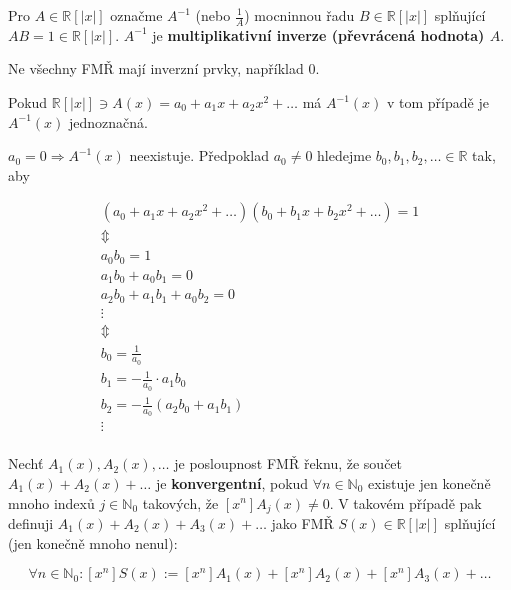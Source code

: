 \begin{definice}
	Pro $A \in \mathbb{R}[|x|]$ označme $A^{-1}$ (nebo $\frac{1}{A}$) mocninnou řadu $B \in \mathbb{R}[|x|]$ splňující $AB = 1 \in \mathbb{R}[|x|]$. $A^{-1}$ je \textbf{multiplikativní inverze (převrácená hodnota) $A$}.
\end{definice}

\begin{pozn}
	Ne všechny FMŘ mají inverzní prvky, například $0$.
\end{pozn}

\begin{tvrz}
	Pokud $\mathbb{R}[|x|] \ni A(x) = a_{0} + a_{1} x + a_{2} x^{2} + \dots$ má $A^{-1}(x)$ v tom případě je $A^{-1}(x)$ jednoznačná.
\end{tvrz}

\begin{dukaz}
	$a_{0} = 0 \Rightarrow A^{-1}(x)$ neexistuje. Předpoklad $a_{0} \neq 0$ hledejme $b_{0},b_{1},b_{2},\dots \in \mathbb{R}$ tak, aby
	
	$$
	\begin{array}{c}
		(a_{0} + a_{1} x + a_{2} x^{2} + \dots)(b_{0} + b_{1} x + b_{2} x^{2} + \dots) = 1 \\
		\Updownarrow \\
		a_{0}b_{0} = 1 \\
		a_{1}b_{0} + a_{0}b_{1} = 0 \\
		a_{2}b_{0} + a_{1}b_{1} + a_{0}b_{2} = 0 \\
		\vdots \\
		\Updownarrow \\
		b_{0} = \frac{1}{a_{0}} \\
		b_{1} = - \frac{1}{a_{0}} \cdot a_{1}b_{0} \\
		b_{2} = - \frac{1}{a_{0}}(a_{2}b_{0} + a_{1}b_{1}) \\
		\vdots \\
	\end{array}
	$$
\end{dukaz}

\begin{definice}
	Nechť $A_{1}(x), A_{2}(x), \dots$ je posloupnost FMŘ řeknu, že součet $A_{1}(x) + A_{2}(x) + \dots$ je \textbf{konvergentní}, pokud $\forall n \in \mathbb{N}_{0}$ existuje jen konečně mnoho indexů $j \in \mathbb{N}_{0}$ takových, že $[x^{n}]A_{j}(x) \neq 0$. V takovém případě pak definuji $A_{1}(x) + A_{2}(x) + A_{3}(x) + \dots$ jako FMŘ $S(x) \in \mathbb{R}[|x|]$ splňující (jen konečně mnoho nenul):
	
	$$
	\forall n \in \mathbb{N}_{0}: [x^{n}]S(x) := [x^{n}]A_{1}(x) + [x^{n}]A_{2}(x) + [x^{n}]A_{3}(x) + \dots
	$$
\end{definice}

